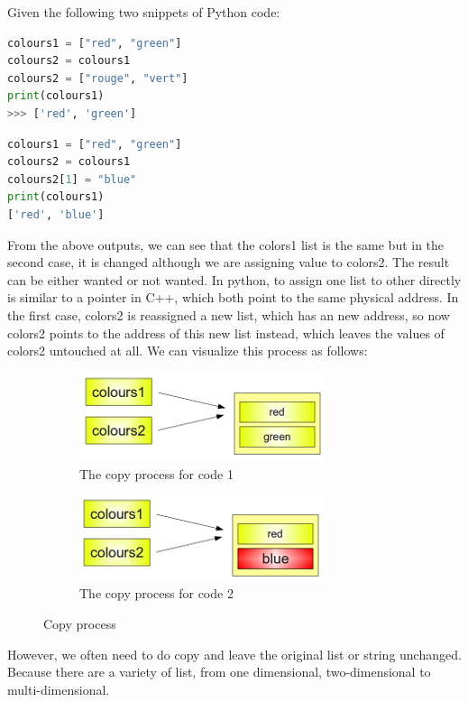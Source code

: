 \documentclass[../main.tex]{subfiles}
\begin{document}
Given the following two snippets of Python code:
\begin{lstlisting}[language = Python]
colours1 = ["red", "green"]
colours2 = colours1
colours2 = ["rouge", "vert"]
print(colours1)
>>> ['red', 'green']
\end{lstlisting}

\begin{lstlisting}[language = Python]
colours1 = ["red", "green"]
colours2 = colours1
colours2[1] = "blue"
print(colours1)
['red', 'blue']
\end{lstlisting}

From the above outputs, we can see that the colors1 list is the same but in the second case, it is changed although we are assigning value to colors2. The result can be either wanted or not wanted. In python, to assign one list to other directly is similar to a pointer in C++, which both point to the same physical address. In the first case, colors2 is reassigned a new list, which has an new address, so now colors2 points to the address of this new list instead, which leaves the values of colors2 untouched at all. We can visualize this process as follows:
\begin{figure}[h]
\begin{subfigure}[b]{0.5\linewidth}
\centering
\includegraphics[width = 0.98\linewidth]{fig/deep_copy_1.png}
\caption{The copy process for code 1}
\end{subfigure}
\begin{subfigure}[b]{0.5\linewidth}
\centering
\includegraphics[width = 0.98\linewidth]{fig/deep_copy_2.png}
\caption{The copy process for code 2}
\end{subfigure}
\caption{Copy process}
\label{fig:copy_shallow}
\end{figure}
However, we often need to do copy and leave the original list or string unchanged. Because there are a variety of list, from one dimensional, two-dimensional to multi-dimensional. 
\end{document}
